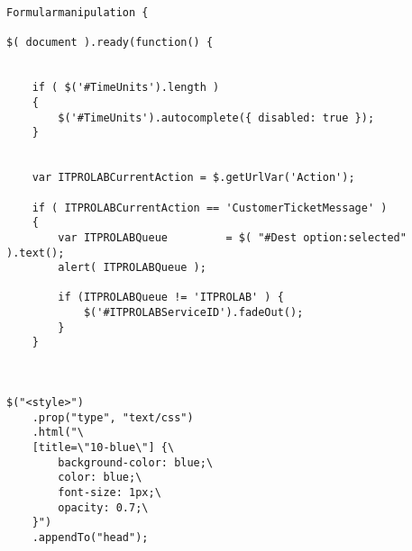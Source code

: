 

\begin{lstlisting}[caption={Formularmanipulation},
label=lst:Beispielcode 1] Formularmanipulation {

$( document ).ready(function() {


    if ( $('#TimeUnits').length )
    {
        $('#TimeUnits').autocomplete({ disabled: true });
    }


    var ITPROLABCurrentAction = $.getUrlVar('Action');

    if ( ITPROLABCurrentAction == 'CustomerTicketMessage' )
    {
        var ITPROLABQueue         = $( "#Dest option:selected" ).text();
        alert( ITPROLABQueue );

        if (ITPROLABQueue != 'ITPROLAB' ) {
            $('#ITPROLABServiceID').fadeOut();
        }
    }



$("<style>")
    .prop("type", "text/css")
    .html("\                                                                                                    
    [title=\"10-blue\"] {\                                                                                      
        background-color: blue;\                                                                                
        color: blue;\                                                                                           
        font-size: 1px;\                                                                                        
        opacity: 0.7;\                                                                                          
    }")
    .appendTo("head");
    
\end{lstlisting}
